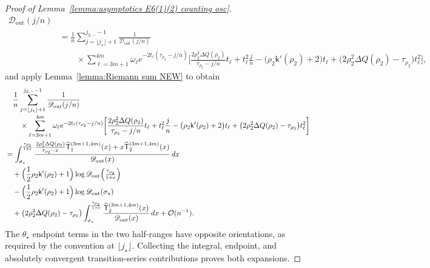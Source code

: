 \documentclass[a4paper]{article}
\numberwithin{equation}{section}
\begin{document}
\begin{proof}[Proof of Lemma~\ref{lemma:asymptotics E6(1)(2) counting osc}]
\begin{align*}
{}{
\mathscr D_{\mathrm{out}}(j/n)
}
\\
&=\frac{1}{n}\sum_{j=\lfloor j_{\star}\rfloor+1}^{j_{2,-}-1}
\frac{1}{\mathscr D_{\mathrm{out}}(j/n)}
\\[-2pt]
&\qquad\times
\sum_{\ell=3m+1}^{4m}\omega_{\ell}e^{-2t_{\ell}(\tau_{\rho_2}-j/n)}
\bigg[
\frac{2\rho_2^2\Delta Q(\rho_2)}{\tau_{\rho_2}-j/n}t_{\ell}
+t_{\ell}^2\frac{j}{n}
-\bigl(\rho_2\mathsf{k}'(\rho_2)+2\bigr)t_{\ell}
+
\bigl( 
2\rho_2^2\Delta Q(\rho_2)-\tau_{\rho_2}
\bigr)t_{\ell}^2
\bigg], 
\end{align*}
and apply Lemma~\ref{lemma:Riemann sum NEW} to obtain
\begin{align*}
&\quad
\frac{1}{n}\sum_{j=\lfloor j_{\star}\rfloor+1}^{j_{2,-}-1}
\frac{1}{\mathscr D_{\mathrm{out}}(j/n)}
\\[-2pt]
&\qquad\times
\sum_{\ell=3m+1}^{4m}\omega_{\ell}e^{-2t_{\ell}(\tau_{\rho_2}-j/n)}
\bigg[
\frac{2\rho_2^2\Delta Q(\rho_2)}{\tau_{\rho_2}-j/n}t_{\ell}
+t_{\ell}^2\frac{j}{n}
-\bigl(\rho_2\mathsf{k}'(\rho_2)+2\bigr)t_{\ell}
+
\bigl( 
2\rho_2^2\Delta Q(\rho_2)-\tau_{\rho_2}
\bigr)t_{\ell}^2
\bigg]
\\
&=
\int_{\sigma_{\star}}^{\frac{\tau_{\rho_2}}{1+\epsilon}}
\frac{\frac{2\rho_2^2\Delta Q(\rho_2)}{\tau_{\rho_2}-x}
\widehat{\mathsf{T}}_{1}^{(3m+1,4m)}(x)
+x\widehat{\mathsf{T}}_{2}^{(3m+1,4m)}(x)}{\mathscr D_{\mathrm{out}}(x)}\,dx
\\
&\quad 
+\Bigl(\frac{1}{2}\rho_2\mathsf{k}'(\rho_2)+1\Bigr)
\log\mathscr D_{\mathrm{out}}\Bigl(\tfrac{\tau_{\rho_2}}{1+\epsilon}\Bigr)
\\
&\quad
-\Bigl(\frac{1}{2}\rho_2\mathsf{k}'(\rho_2)+1\Bigr)
\log\mathscr D_{\mathrm{out}}(\sigma_{\star})
\\
&\quad 
+\bigl( 
2\rho_2^2\Delta Q(\rho_2)-\tau_{\rho_2}
\bigr)
\int_{\sigma_{\star}}^{\frac{\tau_{\rho_2}}{1+\epsilon}}
\frac{\widehat{\mathsf{T}}_{2}^{(3m+1,4m)}(x)}{\mathscr D_{\mathrm{out}}(x)}\,dx
+\mathcal{O}(n^{-1}).
\end{align*}
The $\theta_\star$ endpoint terms in the two half-ranges have opposite
orientations, as required by the convention at $\lfloor j_\star\rfloor$.
Collecting the integral, endpoint, and absolutely convergent transition-series
contributions proves both expansions.

\end{proof}
\end{document}
